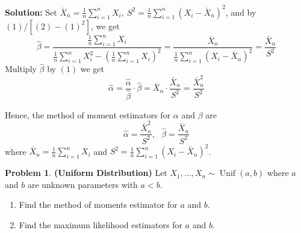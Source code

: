\documentclass[13pt]{article}
\theoremstyle{definition}
\newtheorem{problem}[theorem]{Problem}
\newenvironment{solution}
{\color{C2}\begin{framed}\begingroup\textbf{Solution:} }
  {\endgroup\end{framed}}
\theoremstyle{remark}
\begin{document}
\begin{solution}
Set $\bar{X}_n=\frac{1}{n}\sum_{i=1}^n X_i, \ S^2 = \frac{1}{n}\sum_{i=1}^n (X_i-\bar{X}_n)^2$, and by $(1)/[(2)-(1)^2]$, we get
\[
\hat{\beta} = \frac{\frac{1}{n}\sum_{i=1}^n X_i}{\frac{1}{n}\sum_{i=1}^n X_i^2-(\frac{1}{n}\sum_{i=1}^n X_i)^2} = \frac{\bar{X}_n}{\frac{1}{n}\sum_{i=1}^n(X_i-\bar{X}_n)^2} = \frac{\bar{X}_n}{S^2}
\]
Multiply $\hat{\beta}$ by $(1)$ we get
\[
\hat{\alpha}= \frac{\hat{\alpha}}{\hat{\beta}}\cdot \hat{\beta} =\bar{X}_n\cdot \frac{\bar{X}_n}{S^2}  = \frac{\bar{X}_n^2}{S^2}
\]

Hence, the method of moment estimators for $\alpha$ and $\beta$ are
\[
\hat{\alpha}=\frac{\bar{X}_n^2}{S^2}, \ \ \ \hat{\beta} =\frac{\bar{X}_n}{S^2}
\]
where $\bar{X}_n=\frac{1}{n}\sum_{i=1}^n X_i$ and $S^2 = \frac{1}{n}\sum_{i=1}^n (X_i-\bar{X}_n)^2$.
\end{solution}


\begin{problem}\textbf{(Uniform Distribution)}
    Let $X_1, \ldots, X_n \sim \operatorname{Unif}(a,b)$ where $a$ and $b$ are unknown parameters with $a<b$.

    \begin{enumerate}[label=(\alph*),topsep=0pt]
        \item Find the method of moments estimator for $a$ and $b$.
        \item Find the maximum likelihood estimators for $a$ and $b$.
    \end{enumerate}
\end{problem}
\end{document}
